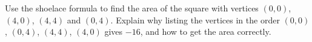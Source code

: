 Use the shoelace formula to find the area of the square with vertices $(0,0)$, $(4,0)$, $(4,4)$ and $(0,4)$. Explain why listing the vertices in the order $(0,0)$, $(0,4)$, $(4,4)$, $(4,0)$ gives $-16$, and how to get the area correctly.
